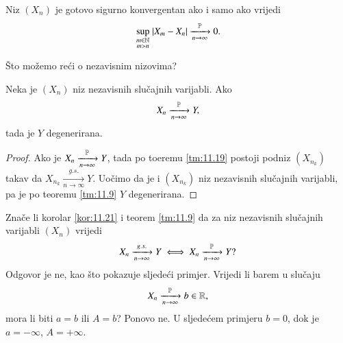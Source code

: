 \begin{zad} \label{zad:11.20}
    Niz $(X_n)$ je gotovo sigurno konvergentan ako i samo ako vrijedi
    \begin{equation*}
        \sup\limits_{
            \begin{smallmatrix}
                m \in \mathbb{N}\\
                m > n
            \end{smallmatrix}
        } |X_m - X_n| \xrightarrow[n \to \infty]{\mathbb{P}} 0.
    \end{equation*}
\end{zad}

\v Sto mo\v zemo re\' ci o nezavisnim nizovima?

\begin{kor} \label{kor:11.21}
    Neka je $(X_n)$ niz nezavisnih slu\v cajnih varijabli.
    Ako
    \begin{equation*}
        X_n \xrightarrow[n \to \infty]{\mathbb{P}} Y,    
    \end{equation*}
    tada je $Y$ degenerirana.
\end{kor}

\begin{proof}
    Ako je $X_n \xrightarrow[n \to \infty]{\mathbb{P}} Y$, tada po toeremu \ref{tm:11.19} postoji podniz $(X_{n_k})$ takav da $X_{n_k} \xrightarrow[n \to \infty]{g.s.} Y$.
    Uo\v cimo da je i $(X_{n_k})$ niz nezavisnih slu\v cajnih varijabli, pa je po teoremu \ref{tm:11.9} $Y$ degenerirana.
\end{proof}

\begin{nap} \label{nap:11.22}
    Zna\v ce li korolar \ref{kor:11.21} i teorem \ref{tm:11.9} da za niz nezavisnih slu\v cajnih varijabli $(X_n)$ vrijedi
    \begin{equation*}
        X_n \xrightarrow[n \to \infty]{g.s.} Y \iff X_n \xrightarrow[n \to \infty]{\mathbb{P}} Y?
    \end{equation*}
    Odgovor je ne, kao \v sto pokazuje sljede\' ci primjer.
    Vrijedi li barem u slu\v caju
    \begin{equation*}
        X_n \xrightarrow[n \to \infty]{\mathbb{P}} b \in \mathbb{R},
    \end{equation*}
    mora li biti $a = b$ ili $A = b$?
    Ponovo ne. U sljede\' cem primjeru $b = 0$, dok je $a = -\infty$, $A = +\infty$.
\end{nap}


